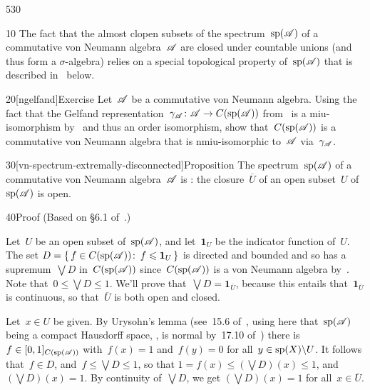 \begin{parsec}{530}%
\begin{point}{10}%
The fact that the almost clopen subsets
of the spectrum~$\mathrm{sp}(\mathscr{A})$
of a commutative von Neumann algebra~$\mathscr{A}$
are closed under countable unions
(and thus form a $\sigma$-algebra)
relies on a special topological property of~$\mathrm{sp}(\mathscr{A})$
that is described in~ below.
\end{point}
\begin{point}{20}[ngelfand]{Exercise}%
Let~$\mathscr{A}$ be a commutative von Neumann algebra.
Using the fact that
the Gelfand representation~$\gamma_{\mathscr{A}}\colon \mathscr{A}\to C(\mathrm{sp}(\mathscr{A}))$
from~
is a miu-isomorphism 
by~
and thus an order isomorphism,
show that~$C(\mathrm{sp}(\mathscr{A}))$
is a commutative von Neumann algebra
that is nmiu-isomorphic
to~$\mathscr{A}$ via~$\gamma_{\mathscr{A}}$.
\end{point}
\begin{point}{30}[vn-spectrum-extremally-disconnected]{Proposition}%
The spectrum~$\mathrm{sp}(\mathscr{A})$
of a commutative von Neumann algebra~$\mathscr{A}$
is :%
the closure~$\overline{U}$
of an open subset~$U$ of~$\mathrm{sp}(\mathscr{A})$
is open.
\begin{point}{40}{Proof}%
(Based on \S6.1 of~\cite{riesz}.)

Let~$U$ be an open subset of~$\mathrm{sp}(\mathscr{A})$,
and let~$\mathbf{1}_U$ be the indicator function
of~$U$.
The set $D=\{\,f\in C(\mathrm{sp}(\mathscr{A}))\colon\, f\leqslant \mathbf{1}_U\,\}$
is directed and bounded 
and so has a supremum~$\bigvee D$
in~$C(\mathrm{sp}(\mathscr{A}))$
since~$C(\mathrm{sp}(\mathscr{A}))$ is a von Neumann algebra by~.
Note that~$0\leq \bigvee D\leq 1$.
We'll prove that~$\bigvee D = \mathbf{1}_{\overline{U}}$,
because this entails
that~$\mathbf{1}_{\overline{U}}$
is continuous,  so that~$\overline{U}$ is both open and closed.

Let~$x\in U$ be given.
By Urysohn's lemma (see~15.6 of~\cite{willard},
using here that~$\mathrm{sp}(\mathscr{A})$ being a compact Hausdorff
space, , 
is normal by~17.10 of~\cite{willard})
there is $f\in [0,1]_{C(\mathrm{sp}(\mathscr{A}))}$
with~$f(x)=1$ and~$f(y)=0$ for all~$y\in \mathrm{sp}(X)\backslash U$.
It follows that~$f\in D$,
and~$f\leq \bigvee D\leq 1$,
so that $1=f(x)\leq (\bigvee D)(x)\leq 1$,
and~$(\bigvee D)(x)=1$.
By continuity of~$\bigvee D$,
we get $(\bigvee D)(x)=1$ for all~$x\in \overline{U}$.


\end{point}
\end{point}
\end{parsec}
